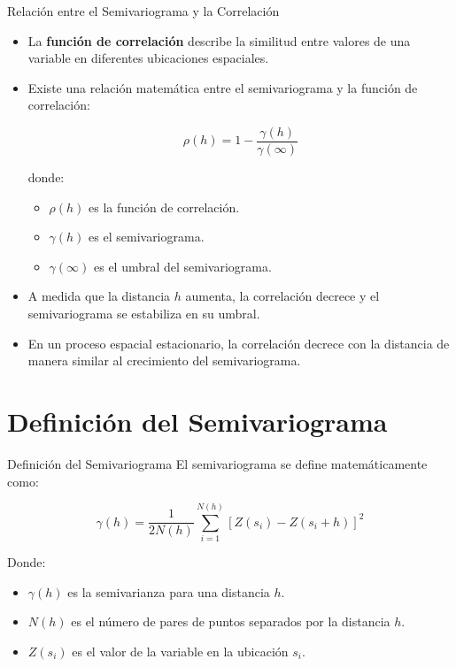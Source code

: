 \documentclass[
  10pt,
  ignorenonframetext,
]{beamer}
\providecommand{\tightlist}{%
  \setlength{\itemsep}{0pt}\setlength{\parskip}{0pt}}
\begin{document}
\begin{frame}{Relación entre el Semivariograma y la Correlación}
\begin{itemize}
\item
  La \textbf{función de correlación} describe la similitud entre valores
  de una variable en diferentes ubicaciones espaciales.
\item
  Existe una relación matemática entre el semivariograma y la función de
  correlación:

  \begin{equation}
  \rho(h) = 1 - \frac{\gamma(h)}{\gamma(\infty)}
  \end{equation}

  donde:

  \begin{itemize}
  \tightlist
  \item
    \(\rho(h)\) es la función de correlación.
  \item
    \(\gamma(h)\) es el semivariograma.
  \item
    \(\gamma(\infty)\) es el umbral del semivariograma.
  \end{itemize}
\item
  A medida que la distancia \(h\) aumenta, la correlación decrece y el
  semivariograma se estabiliza en su umbral.
\item
  En un proceso espacial estacionario, la correlación decrece con la
  distancia de manera similar al crecimiento del semivariograma.
\end{itemize}
\end{frame}

\section{Definición del
Semivariograma}\label{definiciuxf3n-del-semivariograma}

\begin{frame}{Definición del Semivariograma}
El semivariograma se define matemáticamente como:

\begin{equation}
\gamma(h) = \frac{1}{2N(h)} \sum_{i=1}^{N(h)} [Z(s_i) - Z(s_i + h)]^2
\end{equation}

Donde:

\begin{itemize}
\tightlist
\item
  \(\gamma(h)\) es la semivarianza para una distancia \(h\).
\item
  \(N(h)\) es el número de pares de puntos separados por la distancia
  \(h\).
\item
  \(Z(s_i)\) es el valor de la variable en la ubicación \(s_i\).
\end{itemize}
\end{frame}
\end{document}
